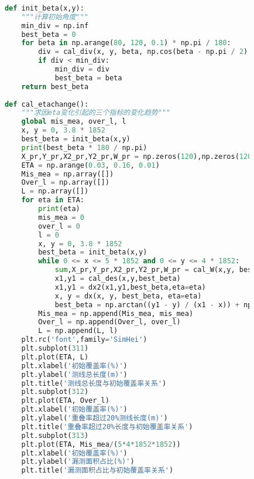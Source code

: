 \documentclass[withoutpreface,bwprint]{cumcmthesis} %
\begin{document}
\begin{appendices}
\begin{lstlisting}[language=python]
            
            def init_beta(x,y):
                """计算初始角度"""
                min_div = np.inf
                best_beta = 0
                for beta in np.arange(80, 120, 0.1) * np.pi / 180:
                    div = cal_div(x, y, beta, np.cos(beta - np.pi / 2) * 500)
                    if div < min_div:
                        min_div = div
                        best_beta = beta
                return best_beta
            
            def cal_etachange():
                """求因eta变化引起的三个指标的变化趋势"""
                global mis_mea, over_l, l
                x, y = 0, 3.8 * 1852
                best_beta = init_beta(x,y)
                print(best_beta * 180 / np.pi)
                X_pr,Y_pr,X2_pr,Y2_pr,W_pr = np.zeros(120),np.zeros(120),np.zeros(120),np.zeros(120),np.zeros(120)
                ETA = np.arange(0.03, 0.16, 0.01)
                Mis_mea = np.array([])
                Over_l = np.array([])
                L = np.array([])
                for eta in ETA:
                    print(eta)
                    mis_mea = 0
                    over_l = 0
                    l = 0
                    x, y = 0, 3.8 * 1852
                    best_beta = init_beta(x,y)
                    while 0 <= x <= 5 * 1852 and 0 <= y <= 4 * 1852:
                        sum,X_pr,Y_pr,X2_pr,Y2_pr,W_pr = cal_W(x,y, best_beta,X_pr,Y_pr,X2_pr,Y2_pr,W_pr)
                        x1,y1 = cal_des(x,y,best_beta)
                        x1,y1 = dx2(x1,y1,best_beta,eta=eta)
                        x, y = dx(x, y, best_beta, eta=eta)
                        best_beta = np.arctan((y1 - y) / (x1 - x)) + np.pi / 2
                    Mis_mea = np.append(Mis_mea, mis_mea)
                    Over_l = np.append(Over_l, over_l)
                    L = np.append(L, l)
                plt.rc('font',family='SimHei')
                plt.subplot(311)
                plt.plot(ETA, L)
                plt.xlabel('初始覆盖率(%)')
                plt.ylabel('测线总长度(m)')
                plt.title('测线总长度与初始覆盖率关系')
                plt.subplot(312)
                plt.plot(ETA, Over_l)
                plt.xlabel('初始覆盖率(%)')
                plt.ylabel('重叠率超过20%测线长度(m)')
                plt.title('重叠率超过20%长度与初始覆盖率关系')
                plt.subplot(313)
                plt.plot(ETA, Mis_mea/(5*4*1852*1852))
                plt.xlabel('初始覆盖率(%)')
                plt.ylabel('漏测面积占比(%)')
                plt.title('漏测面积占比与初始覆盖率关系')
                

\end{lstlisting}
\end{appendices}
\end{document}
